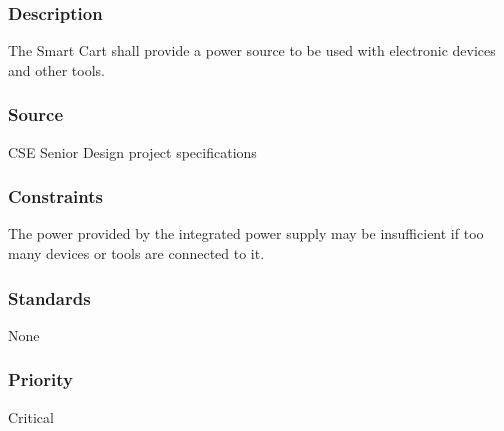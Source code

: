 \subsubsection{Description}
The Smart Cart shall provide a power source to be used with electronic devices and other tools. 
\subsubsection{Source}
CSE Senior Design project specifications
\subsubsection{Constraints}
The power provided by the integrated power supply may be insufficient if too many devices or tools are connected to it.
\subsubsection{Standards}
None
\subsubsection{Priority}
Critical
